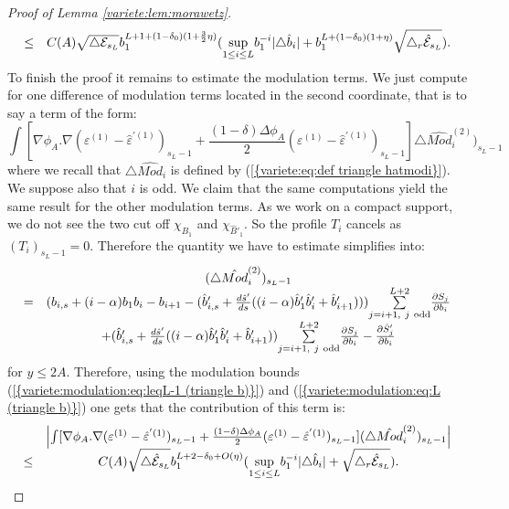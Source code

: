 \documentclass[11pt,a4paper,reqno]{amsart}
\theoremstyle{remark}
\numberwithin{equation}{section}
\begin{document}
\begin{proof}[Proof of Lemma \ref{variete:lem:morawetz}]
\begin{equation}
\begin{array}{r c l}
\leq & C(A)\sqrt{\triangle \mathcal{E}_{s_L}}b_1^{L+1+(1-\delta_0)(1+\frac{3}{2}\eta)}(\underset{1\leq i \leq L}{\text{sup}}b_1^{-i}|\triangle \hat{b}_i|+b_1^{L+(1-\delta_0)(1+\eta)}\sqrt{\triangle_r \hat{\mathcal{E}}_{s_L}}).
\end{array}
\end{equation}
To finish the proof it remains to estimate the modulation terms. We just compute for one difference of modulation terms located in the second coordinate, that is to say a term of the form:
$$
\int [\nabla \phi_A .\nabla(\varepsilon^{(1)}-\hat{\varepsilon}^{'(1)})_{s_L-1}+\frac{(1-\delta)\Delta \phi_A}{2}(\varepsilon^{(1)}-\hat{\varepsilon}^{'(1)})_{s_L-1}]\triangle \hat{Mod}^{(2)}_i)_{s_L-1}
$$
where we recall that $\triangle \hat{Mod}_i$ is defined by {{\rm (\ref{{variete:eq:def triangle hatmodi}})}}. We suppose also that $i$ is odd. We claim that the same computations yield the same result for the other modulation terms. As we work on a compact support, we do not see the two cut off $\chi_{B_1}$ and $\chi_{\hat{B}'_1}$. So the profile $T_i$ cancels as $(T_i)_{s_L-1}=0$. Therefore the quantity we have to estimate simplifies into:
$$
\begin{array}{r c l}
&(\triangle \hat{Mod}^{(2)}_i)_{s_L-1}\\
=& (b_{i,s}+(i-\alpha)b_1b_i-b_{i+1}-(\hat{b}'_{i,s}+\frac{d\hat{s}'}{ds}((i-\alpha)\hat{b}'_1\hat{b}'_i+\hat{b}'_{i+1}))) \underset{j=i+1, \ j \ \text{odd}}{\overset{L+2}{\sum}} \frac{\partial S_j}{\partial b_i} \\
&+(\hat{b}'_{i,s}+\frac{d\hat{s}'}{ds}((i-\alpha)\hat{b}'_1\hat{b}'_i+\hat{b}'_{i+1})) \underset{j=i+1, \ j \ \text{odd}}{\overset{L+2}{\sum}} \frac{\partial S_j}{\partial b_i}-\frac{\partial \hat{S}'_j}{\partial b_i}
\end{array}
$$
for $y\leq 2A$. Therefore, using the modulation bounds {{\rm (\ref{{variete:modulation:eq:leqL-1 (triangle b)}})}} and {{\rm (\ref{{variete:modulation:eq:L (triangle b)}})}} one gets that the contribution of this term is:
$$
\begin{array}{r c l}
&\left| \int [\nabla \phi_A .\nabla(\varepsilon^{(1)}-\hat{\varepsilon}^{'(1)})_{s_L-1}+\frac{(1-\delta)\Delta \phi_A}{2}(\varepsilon^{(1)}-\hat{\varepsilon}^{'(1)})_{s_L-1}](\triangle \hat{Mod}^{(2)}_i)_{s_L-1} \right| \\
\leq & C(A) \sqrt{\triangle \hat{\mathcal{E}}_{s_L}}b_1^{L+2-\delta_0+O(\eta)}(\underset{1\leq i \leq L}{\text{sup}}b_1^{-i}|\triangle \hat{b}_i|+\sqrt{\triangle_r \hat{\mathcal{E}}_{s_L}}).
\end{array}
$$
\end{proof}
\end{document}

